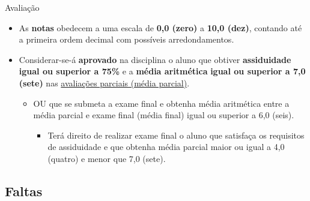 \documentclass{beamer}
\begin{document}
\begin{frame}{Avaliação}
    \begin{itemize}
        \justifying
        \item As \textbf{notas} obedecem a uma escala de \textbf{0,0 (zero)} a \textbf{10,0 (dez)}, contando até a primeira ordem decimal com possíveis arredondamentos.
        \item Considerar-se-á \textbf{aprovado} na disciplina o aluno que obtiver \textbf{assiduidade igual ou superior a 75\%} e a \textbf{média aritmética} \textbf{igual ou superior a 7,0 (sete)} nas \underline{avaliações parciais (média parcial)}. 
        \begin{itemize}
            \justifying
            \item OU que se submeta a \alert<2>{exame final} e obtenha média aritmética entre a média parcial e exame final (média final) igual ou superior a 6,0 (seis).
            \begin{itemize}
                \justifying
                \item<2> Terá direito de realizar exame final o aluno que satisfaça os requisitos de assiduidade e que obtenha média parcial maior ou igual a 4,0 (quatro) e menor que 7,0 (sete).
            \end{itemize}
        \end{itemize}
    \end{itemize}
\end{frame}

\subsection{Faltas}
\end{document}
